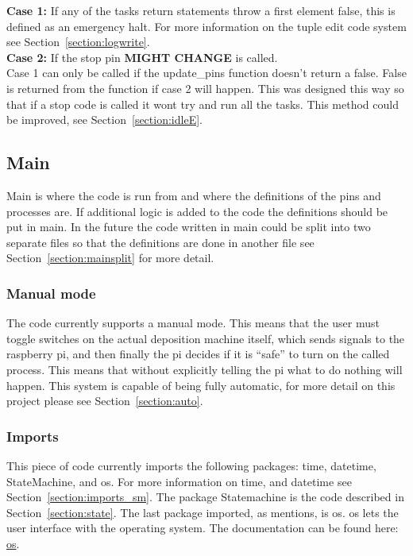 \documentclass[titlepage]{article}
\begin{document}
\textbf{Case 1:} If any of the tasks return statements throw a first element false, this is defined as an emergency halt. For more information on the tuple edit code system see Section~\ref{section:logwrite}. \\

\textbf{Case 2:} If the stop pin \textbf{MIGHT CHANGE} is called. \\

Case 1 can only be called if the update\_pins function doesn't return a false. False is returned from the function if case 2 will happen. This was designed this way so that if a stop code is called it wont try and run all the tasks. This method could be improved, see Section~\ref{section:idleE}.

\subsection{Main}
\label{section:main}
Main is where the code is run from and where the definitions of the pins and processes are. If additional logic is added to the code the definitions should be put in main. In the future the code written in main could be split into two separate files so that the definitions are done in another file see Section~\ref{section:mainsplit} for more detail.

\subsubsection{Manual mode}
The code currently supports a manual mode. This means that the user must toggle switches on the actual deposition machine itself, which sends signals to the raspberry pi, and then finally the pi decides if it is ``safe'' to turn on the called process. This means that without explicitly telling the pi what to do nothing will happen. This system is capable of being fully automatic, for more detail on this project please see Section~\ref{section:auto}.

\subsubsection{Imports}
This piece of code currently imports the following packages: time, datetime, StateMachine, and os. For more information on time, and datetime see Section~\ref{section:imports_sm}. The package Statemachine is the code described in Section~\ref{section:state}. The last package imported, as mentions, is os. os lets the user interface with the operating system. The documentation can be found here: \href{https://docs.python.org/3/library/os.html}{os}.
\end{document}
